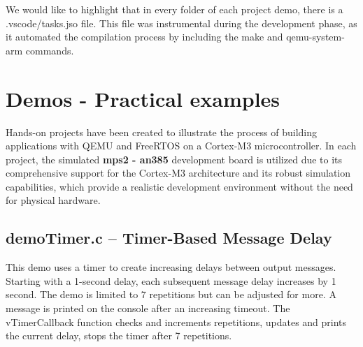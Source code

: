 \documentclass[a4paper, 10pt, oneside]{article} %
\begin{document}
We would like to highlight that in every folder of each project demo, there is a .vscode/tasks.jso file. This file was instrumental during the development phase, as it automated the compilation process by including the make and qemu-system-arm commands.


\section{Demos - Practical examples}


Hands-on projects have been created to illustrate the process of building applications with QEMU and FreeRTOS on a Cortex-M3 microcontroller. In each project, the simulated \textbf{mps2 - an385} development board is utilized due to its comprehensive support for the Cortex-M3 architecture and its robust simulation capabilities, which provide a realistic development environment without the need for physical hardware.

\subsection{demoTimer.c -- Timer-Based Message Delay}

This demo uses a timer to create increasing delays between output messages. Starting with a 1-second delay, each subsequent message delay increases by 1 second. The demo is limited to 7 repetitions but can be adjusted for more. A message is printed on the console after an increasing timeout. The vTimerCallback function checks and increments repetitions, updates and prints the current delay, stops the timer after 7 repetitions.


\begin{comment}

\begin{lstlisting}[language=C, caption={The vTimerCallback function checks and increments repetitions, updates and prints the current delay, stops the timer after 7 repetitions.}]
void vTimerCallback(TimerHandle_t xTimer) {
    if (repetitions < MAX_REPS) {
        printf("Message delay: %d\n", currentDelay);
        repetitions++;
        currentDelay += 1000;
        xTimerChangePeriod(xTimer, pdMS_TO_TICKS((currentDelay)), 0);
    } else {
        xTimerStop(xTimer, 0);
    }
}
\end{lstlisting}
    
\end{comment}
\end{document}
